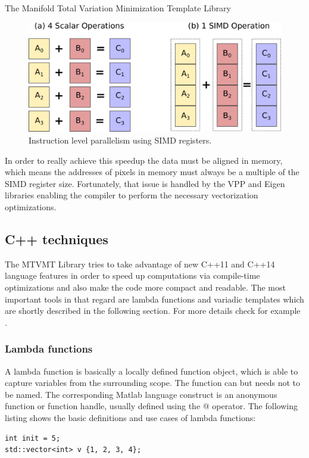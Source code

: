 \begin{chapter}{The Manifold Total Variation Minimization Template Library}
\begin{figure}[h!]
        \centering
	    \includegraphics[width=0.7\linewidth]{./figures/library/SIMD.pdf}
	\caption[SIMD parallelization]{Instruction level parallelism using SIMD registers.
	}
	\label{fig:simd}
\end{figure}

In order to really achieve this speedup the data must be aligned in memory, which means the addresses of pixels in memory must always be a multiple of the SIMD register size. Fortunately,
that issue is handled by the VPP and Eigen libraries enabling the compiler to perform the necessary vectorization optimizations.



\subsection{C++ techniques} %
\label{sub:C++ techniques}
The MTVMT Library tries to take advantage of new C++11 and C++14 language features in order to speed up computations via compile-time optimizations and also make the code
more compact and readable. The most important tools in that regard are lambda functions and variadic templates which are shortly described in the following section.
For more details check for example \cite{CPPEleven}.

\subsubsection{Lambda functions} %
\label{ssub:Lambda functions}
A lambda function is basically a locally defined function object, which is able to capture variables from the surrounding scope. The function can but needs not to be named.
The corresponding Matlab language construct is an anonymous function or function handle, usually defined using the @ operator. The following listing
shows the basic definitions and use cases of lambda functions:\\

\cppinline
\begin{lstlisting}[label=code:lambdafun,caption={Lambda functions}]
int init = 5;
std::vector<int> v {1, 2, 3, 4};


\end{lstlisting}
\end{chapter}
